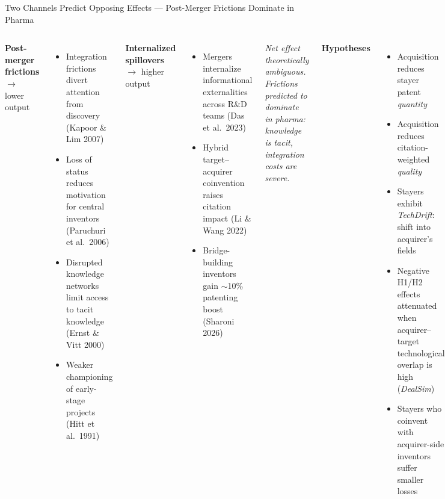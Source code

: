 \documentclass[10pt,aspectratio=169]{beamer}
\begin{document}
\begin{frame}{Two Channels Predict Opposing Effects --- Post-Merger Frictions Dominate in Pharma}

\begin{columns}[T]


  {\color{accentred}\textbf{Post-merger frictions} $\rightarrow$ lower output}
  \begin{itemize}\footnotesize
    \item Integration frictions divert attention from discovery (Kapoor \& Lim 2007)
    \item Loss of status reduces motivation for central inventors (Paruchuri et al.\ 2006)
    \item Disrupted knowledge networks limit access to tacit knowledge (Ernst \& Vitt 2000)
    \item Weaker championing of early-stage projects (Hitt et al.\ 1991)
  \end{itemize}

  \vspace{0.3em}
  {\color{accentgreen}\textbf{Internalized spillovers} $\rightarrow$ higher output}
  \begin{itemize}\footnotesize
    \item Mergers internalize informational externalities across R\&D teams (Das et al.\ 2023)
    \item Hybrid target--acquirer coinvention raises citation impact (Li \& Wang 2022)
    \item Bridge-building inventors gain ${\sim}$10\% patenting boost (Sharoni 2026)
  \end{itemize}

  \vspace{0.2em}
  {\scriptsize\color{midgray}\textit{Net effect theoretically ambiguous. Frictions predicted to dominate in pharma: knowledge is tacit, integration costs are severe.}\par}


  \textbf{Hypotheses}
  \begin{itemize}\footnotesize
    \item[\color{accentred}\textbf{H1}] Acquisition reduces stayer patent \textit{quantity}
    \item[\color{accentred}\textbf{H2}] Acquisition reduces citation-weighted \textit{quality}
    \item[\color{accentred}\textbf{H3}] Stayers exhibit \textit{TechDrift}: shift into acquirer's fields
    \item[\color{accentgreen}\textbf{H4}] Negative H1/H2 effects attenuated when acquirer--target technological overlap is high (\textit{DealSim})
    \item[\color{accentgreen}\textbf{H5}] Stayers who coinvent with acquirer-side inventors suffer smaller losses
  \end{itemize}


\end{columns}
\end{frame}
\end{document}
